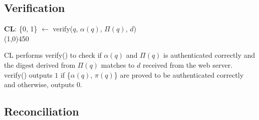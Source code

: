 \subsection{Verification}
\begin{framed}
\noindent
\textbf{CL}: \textsf{\{0, 1\} $\leftarrow$ verify($q$, $\alpha(q)$, $\Pi(q)$, $d$)}	\\
\line(1,0){450}

\noindent
\textsf{CL} performs \textsf{verify()} to check if $\alpha(q)$ and $\Pi(q)$ is authenticated correctly and the digest derived from $\Pi(q)$ matches to $d$ received from the web server.
\textsf{verify()} outputs $1$ if \textsf{\{$\alpha(q)$, $\pi(q)$\}} are proved to be authenticated correctly and otherwise, outputs $0$.
\end{framed}

\subsection{Reconciliation}
\label{label:reconcile}

